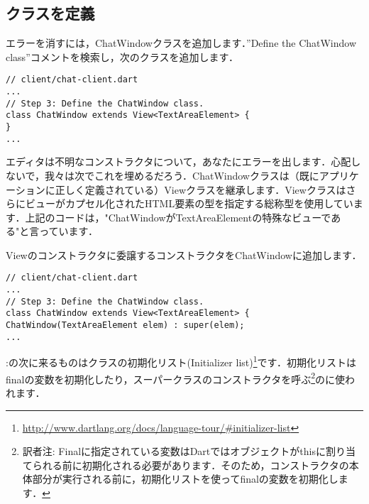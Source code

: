 \subsection{クラスを定義}

エラーを消すには，ChatWindowクラスを追加します．''Define the ChatWindow class''コメントを検索し，次のクラスを追加します．

\begin{verbatim}
// client/chat-client.dart
...
// Step 3: Define the ChatWindow class.
class ChatWindow extends View<TextAreaElement> {
}
...
\end{verbatim}

エディタは不明なコンストラクタについて，あなたにエラーを出します．心配しないで，我々は次でこれを埋めるだろう．ChatWindowクラスは（既にアプリケーションに正しく定義されている）Viewクラスを継承します．Viewクラスはさらにビューがカプセル化されたHTML要素の型を指定する総称型を使用しています．上記のコードは，"ChatWindowがTextAreaElementの特殊なビューである"と言っています．


Viewのコンストラクタに委譲するコンストラクタをChatWindowに追加します．

\begin{verbatim}
// client/chat-client.dart
...
// Step 3: Define the ChatWindow class.
class ChatWindow extends View<TextAreaElement> {
ChatWindow(TextAreaElement elem) : super(elem);
...
\end{verbatim}

:の次に来るものはクラスの初期化リスト(Initializer list)\footnote{\url{http://www.dartlang.org/docs/language-tour/#initializer-list}}です．初期化リストはfinalの変数を初期化したり，スーパークラスのコンストラクタを呼ぶ\footnote{訳者注: Finalに指定されている変数はDartではオブジェクトがthisに割り当てられる前に初期化される必要があります．そのため，コンストラクタの本体部分が実行される前に，初期化リストを使ってfinalの変数を初期化します．}のに使われます．

